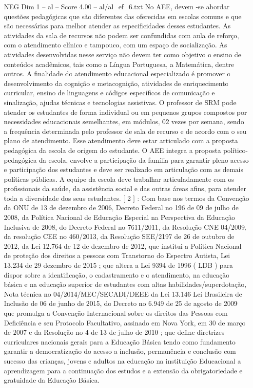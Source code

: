 \begin{textsample}{NEG Dim 1 – al – Score 4.00 – al/al\_ef\_6.txt}
No AEE, devem -se abordar questões pedagógicas que são diferentes das oferecidas em escolas comuns e que são necessárias para melhor atender as especificidades desses estudantes.
As atividades da sala de recursos não podem ser confundidas com aula de reforço, com o atendimento clínico e tampouco, com um espaço de socialização.
As atividades desenvolvidas nesse serviço não devem ter como objetivo o ensino de conteúdos acadêmicos, tais como a Língua Portuguesa, a Matemática, dentre outros.
A finalidade do atendimento educacional especializado é promover o desenvolvimento da cognição e metacognição, atividades de enriquecimento curricular, ensino de linguagens e códigos específicos de comunicação e sinalização, ajudas técnicas e tecnologias assistivas.
O professor de SRM pode atender os estudantes de forma individual ou em pequenos grupos compostos por necessidades educacionais semelhantes, em módulos, 02 vezes por semana, sendo a frequência determinada pelo professor de sala de recurso e de acordo com o seu plano de atendimento.
Esse atendimento deve estar articulado com a proposta pedagógica da escola de origem do estudante.
O AEE integra a proposta político-pedagógica da escola, envolve a participação da família para garantir pleno acesso e participação dos estudantes e deve ser realizado em articulação com as demais políticas públicas.
A equipe da escola deve trabalhar articuladamente com os profissionais da saúde, da assistência social e das outras áreas afins, para atender toda a diversidade dos seus estudantes. [ 2 ] : Com base nos termos da Convenção da ONU de 13 de dezembro de 2006, Decreto Federal no 196 de 09 de julho de 2008, da Política Nacional de Educação Especial na Perspectiva da Educação Inclusiva de 2008, do Decreto Federal no 7611/2011, da Resolução CNE 04/2009, da resolução CEE no 460/2013, da Resolução SEE/2197 de 26 de outubro de 2012, da Lei 12.764 de 12 de dezembro de 2012, que institui a Política Nacional de proteção dos direitos a pessoas com Transtorno do Espectro Autista, Lei 13.234 de 29 dezembro de 2015 ; que altera a Lei 9394 de 1996 ( LDB ) para dispor sobre a identificação, o cadastramento e o atendimento, na educação básica e na educação superior de estudantes com altas habilidades/superdotação, Nota técnica no 04/2014/MEC/SECADI/DEEE da Lei 13.146 Lei Brasileira de Inclusão de 06 de junho de 2015, do Decreto no 6.949 de 25 de agosto de 2009 que promulga a Convenção Internacional sobre os direitos das Pessoas com Deficiência e seu Protocolo Facultativo, assinado em Nova York, em 30 de março de 2007 e da Resolução no 4 de 13 de julho de 2010 ; que define diretrizes curriculares nacionais gerais para a Educação Básica tendo como fundamento garantir a democratização do acesso a inclusão, permanência e conclusão com sucesso das crianças, jovens e adultos na educação na instituição Educacional a aprendizagem para a continuação dos estudos e a extensão da obrigatoriedade e gratuidade da Educação Básica.

\end{textsample}
